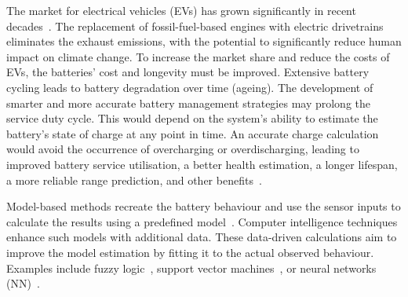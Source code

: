  {
    The market for electrical vehicles (EVs) has grown significantly in recent decades~\cite{state-ev-australia}.
    The replacement of fossil-fuel-based engines with electric drivetrains eliminates the exhaust emissions, with the potential to significantly reduce human impact on climate change.
    To increase the market share and reduce the costs of EVs, the batteries' cost and longevity must be improved.
    Extensive battery cycling leads to battery degradation over time (ageing).
    The development of smarter and more accurate battery management strategies may prolong the service duty cycle.
    This would depend on the system's ability to estimate the battery's state of charge at any point in time.
    An accurate charge calculation would avoid the occurrence of overcharging or overdischarging, leading to improved battery service utilisation, a better health estimation, a longer lifespan, a more reliable range prediction, and other benefits~\cite{calif_proper_2008}.
}

%
Model-based methods recreate the battery behaviour and use the sensor inputs to calculate the results using a predefined model~\cite{6953745}.
Computer intelligence techniques enhance such models with additional data.
These data-driven calculations aim to improve the model estimation by fitting it to the actual observed behaviour.
Examples include fuzzy logic~\cite{malkhandi_fuzzy_2006}, support vector machines~\cite{hansen_support_2005, anton_battery_2013}, or neural networks (NN)~\cite{song_lithium-ion_2018,Chemali2017,mamo_long_2020,jiao_gru-rnn_2020,xiao_accurate_2019,javid_adaptive_2020,zhang_deep_2020}.

